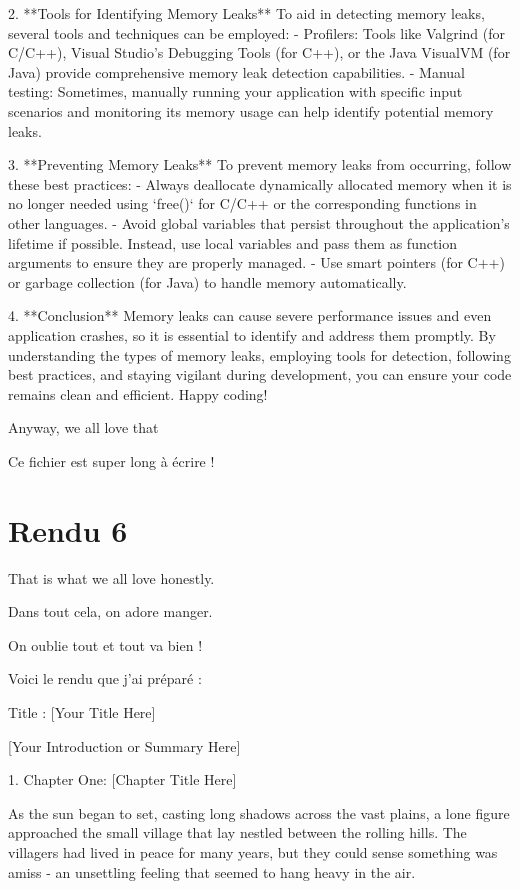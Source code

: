 \documentclass{mytex}
\begin{document}
2. **Tools for Identifying Memory Leaks**
   To aid in detecting memory leaks, several tools and techniques can be employed:
   - Profilers: Tools like Valgrind (for C/C++), Visual Studio's Debugging Tools (for C++), or the Java VisualVM (for Java) provide comprehensive memory leak detection capabilities.
   - Manual testing: Sometimes, manually running your application with specific input scenarios and monitoring its memory usage can help identify potential memory leaks.

3. **Preventing Memory Leaks**
   To prevent memory leaks from occurring, follow these best practices:
   - Always deallocate dynamically allocated memory when it is no longer needed using `free()` for C/C++ or the corresponding functions in other languages.
   - Avoid global variables that persist throughout the application's lifetime if possible. Instead, use local variables and pass them as function arguments to ensure they are properly managed.
   - Use smart pointers (for C++) or garbage collection (for Java) to handle memory automatically.

4. **Conclusion**
   Memory leaks can cause severe performance issues and even application crashes, so it is essential to identify and address them promptly. By understanding the types of memory leaks, employing tools for detection, following best practices, and staying vigilant during development, you can ensure your code remains clean and efficient. Happy coding!

Anyway, we all love that

Ce fichier est super long à écrire !
\section{Rendu 6}

That is what we all love honestly.

Dans tout cela, on adore manger.

On oublie tout et tout va bien !

Voici le rendu que j'ai préparé :

Title : [Your Title Here]

[Your Introduction or Summary Here]

1. Chapter One: [Chapter Title Here]

   As the sun began to set, casting long shadows across the vast plains, a lone figure approached the small village that lay nestled between the rolling hills. The villagers had lived in peace for many years, but they could sense something was amiss - an unsettling feeling that seemed to hang heavy in the air.
\end{document}
